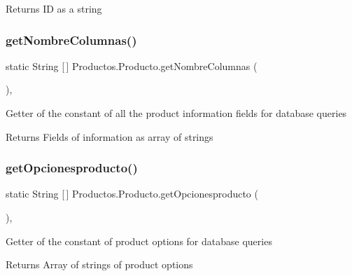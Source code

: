 \begin{DoxyReturn}{Returns}
ID as a string 
\end{DoxyReturn}
\mbox{\label{class_productos_1_1_producto_a2aa076fdb51668e1d75dd216a00ec909}} 
\subsubsection{\texorpdfstring{get\+Nombre\+Columnas()}{getNombreColumnas()}}
{\footnotesize\ttfamily static String \mbox{[}$\,$\mbox{]} Productos.\+Producto.\+get\+Nombre\+Columnas (\begin{DoxyParamCaption}{ }\end{DoxyParamCaption})\hspace{0.3cm}{\ttfamily [inline]}, {\ttfamily [static]}}

Getter of the constant of all the product information fields for database queries

\begin{DoxyReturn}{Returns}
Fields of information as array of strings 
\end{DoxyReturn}
\mbox{\label{class_productos_1_1_producto_ac432aecde9919dbdd6df6002292c3c6d}} 
\subsubsection{\texorpdfstring{get\+Opcionesproducto()}{getOpcionesproducto()}}
{\footnotesize\ttfamily static String \mbox{[}$\,$\mbox{]} Productos.\+Producto.\+get\+Opcionesproducto (\begin{DoxyParamCaption}{ }\end{DoxyParamCaption})\hspace{0.3cm}{\ttfamily [inline]}, {\ttfamily [static]}}

Getter of the constant of product options for database queries

\begin{DoxyReturn}{Returns}
Array of strings of product options 
\end{DoxyReturn}
\mbox{\label{class_productos_1_1_producto_aceed34a26585af33140a3d9232d0cc64}} 
